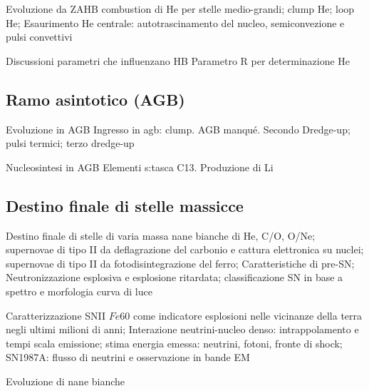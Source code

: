\begin{frame}{Evoluzione da ZAHB}
combustion di He per stelle medio-grandi; clump He; loop He; Esaurimento He centrale: autotrascinamento del nucleo, semiconvezione e pulsi convettivi
\end{frame}

\begin{frame}{Discussioni parametri che influenzano HB}
Parametro R per determinazione He
\end{frame}

\subsection{Ramo asintotico (AGB)}

\begin{frame}{Evoluzione in AGB}
Ingresso in agb: clump. AGB manqu\'e. Secondo Dredge-up; pulsi termici; terzo dredge-up
\end{frame}

\begin{frame}{Nucleosintesi in AGB}
Elementi s:tasca C13. Produzione di Li
\end{frame}

\subsection{Destino finale di stelle massicce}

\begin{frame}{Destino finale di stelle di varia massa}
nane bianche di He, C/O, O/Ne; supernovae di tipo II da deflagrazione del carbonio e cattura elettronica su nuclei; supernovae di tipo II da fotodisintegrazione del ferro; Caratteristiche di pre-SN; Neutronizzazione esplosiva e esplosione ritardata; classificazione SN in base a spettro e morfologia curva di luce
\end{frame}

\begin{frame}{Caratterizzazione SNII}
$Fe60$ come indicatore esplosioni nelle vicinanze della terra negli ultimi milioni di anni; Interazione neutrini-nucleo denso: intrappolamento e tempi scala emissione; stima energia emessa: neutrini, fotoni, fronte di shock; SN1987A: flusso di neutrini e osservazione in bande EM
\end{frame}


\begin{frame}{Evoluzione di nane bianche}

\end{frame}

